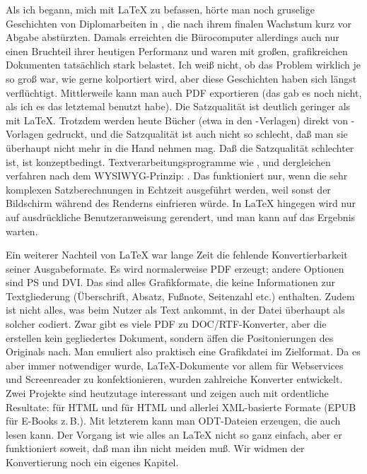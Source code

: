 \documentclass[
	11pt,        %
	table,       %
	twoside,     %
	notitlepage, %
]{scrreprt}
\begin{document}
Als ich begann, mich mit \LaTeX{} zu befassen, hörte man noch gruselige Geschichten von Diplomarbeiten in , die nach ihrem finalen Wachstum kurz vor Abgabe abstürzten. Damals erreichten die Bürocomputer allerdings auch nur einen Bruchteil ihrer heutigen Performanz und waren mit großen, grafikreichen Dokumenten tatsächlich stark belastet. Ich weiß nicht, ob das Problem wirklich je so groß war, wie gerne kolportiert wird, aber diese Geschichten haben sich längst verflüchtigt. Mittlerweile kann man auch PDF exportieren (das gab es noch nicht, als ich es das letztemal benutzt habe). Die Satzqualität ist deutlich geringer als mit \LaTeX. Trotzdem werden heute Bücher (etwa in den -Verlagen) direkt von -Vorlagen gedruckt, und die Satzqualität ist auch nicht so schlecht, daß man sie überhaupt nicht mehr in die Hand nehmen mag. Daß die Satzqualität schlechter ist, ist konzeptbedingt. Textverarbeitungsprogramme wie ,  und dergleichen verfahren nach dem WYSIWYG-Prinzip: . Das funktioniert nur, wenn die sehr komplexen Satzberechnungen in Echtzeit ausgeführt werden, weil sonst der Bildschirm während des Renderns einfrieren würde. In \LaTeX{} hingegen wird nur auf ausdrückliche Benutzeranweisung gerendert, und man kann auf das Ergebnis warten.

Ein weiterer Nachteil von \LaTeX{} war lange Zeit die fehlende Konvertierbarkeit seiner Ausgabeformate. Es wird normalerweise PDF erzeugt; andere Optionen sind PS und DVI. Das sind alles Grafikformate, die keine Informationen zur Textgliederung (Überschrift, Absatz, Fußnote, Seitenzahl etc.) enthalten. Zudem ist nicht alles, was beim Nutzer als Text ankommt, in der Datei überhaupt als solcher codiert. Zwar gibt es viele PDF zu DOC/RTF-Konverter, aber die erstellen kein gegliedertes Dokument, sondern äffen die Positonierungen des Originals nach. Man emuliert also praktisch eine Grafikdatei im Zielformat. Da es aber immer notwendiger wurde, \LaTeX{}-Dokumente vor allem für Webservices und Screenreader zu konfektionieren, wurden zahlreiche  Konverter entwickelt. Zwei Projekte sind heutzutage interessant und zeigen auch mit \archbib{} ordentliche Resultate:
\Paket{\LaTeXML{}} für HTML und  für HTML und allerlei XML-basierte Formate (EPUB für E-Books z.\,B.). Mit letzterem kann man ODT-Dateien erzeugen, die auch  lesen kann. Der Vorgang ist wie alles an \LaTeX{} nicht so ganz einfach, aber er funktioniert soweit, daß man ihn nicht meiden muß. Wir widmen der Konvertierung noch ein eigenes Kapitel.
\end{document}
